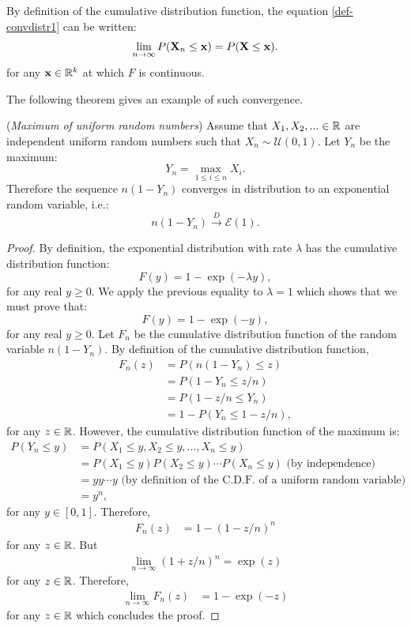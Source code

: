 \documentclass{article}
\begin{document}
By definition of the cumulative distribution function, the equation \ref{def-convdistr1} can be written:
\begin{align}
\label{def-convdistr3}
\lim_{n\rightarrow \infty} P({\bf X}_n\leq {\bf x})=P({\bf X}\leq {\bf x}).
\end{align}
for any ${\bf x}\in \mathbb{R}^k$ at which $F$ is continuous.

The following theorem gives an example of such convergence. 

\begin{example}
(\emph{Maximum of uniform random numbers})
Assume that $X_1,X_2,...\in\mathbb{R}$ are independent uniform random numbers such that $X_n\sim \mathcal{U} (0,1)$. 
Let $Y_n$ be the maximum:
$$
Y_n = \max_{1\leq i\leq n}  X_i.
$$
Therefore the sequence $n(1-Y_n)$ converges in distribution to an exponential random variable, i.e.:
$$
n(1-Y_n) \xrightarrow{D} \mathcal{E}(1).
$$
\end{example}

\begin{proof}
By definition, the exponential distribution with rate $\lambda$ has the cumulative distribution function:
$$
F(y) = 1 - \exp(-\lambda y),
$$
for any real $y\geq 0$.
We apply the previous equality to $\lambda=1$ which shows that we must prove that:
$$
F(y) = 1 - \exp(-y),
$$
for any real $y\geq 0$. 
Let $F_n$ be the cumulative distribution function of the random variable $n(1-Y_n)$. 
By definition of the cumulative distribution function, 
\begin{align*}
F_n(z) 
&= P(n(1-Y_n)\leq z) \\
&= P(1-Y_n\leq z/n) \\
&= P(1-z/n\leq Y_n) \\
&= 1-P(Y_n\leq 1-z/n),
\end{align*}
for any $z\in\mathbb{R}$. 
However, the cumulative distribution function of the maximum is: 
\begin{align*}
P(Y_n\leq y)
& = P(X_1\leq y, X_2\leq y,..., X_n\leq y) \\
& = P(X_1\leq y)P(X_2\leq y) \cdots P(X_n\leq y) \textrm{ (by independence)}\\
& = y y \cdots y \textrm{ (by definition of the C.D.F. of a uniform random variable)}\\
& = y^n,
\end{align*}
for any $y\in[0,1]$. 
Therefore, 
\begin{align*}
F_n(z) 
&= 1-(1-z/n)^n
\end{align*}
for any $z\in\mathbb{R}$. 
But 
\begin{align*}
\lim_{n\rightarrow \infty} (1+z/n)^n = \exp(z)
\end{align*}
for any $z\in\mathbb{R}$. 
Therefore,
\begin{align*}
\lim_{n\rightarrow\infty} F_n(z) 
&= 1-\exp(-z)
\end{align*}
for any $z\in\mathbb{R}$ which concludes the proof.
\end{proof}
\end{document}
